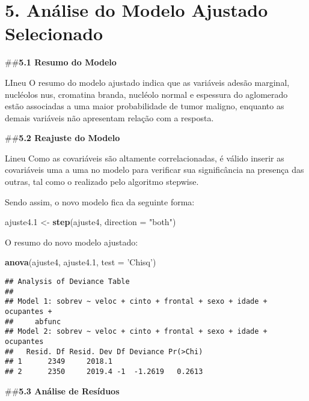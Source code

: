 \documentclass[]{article}
\newenvironment{Shaded}{\begin{snugshade}}{\end{snugshade}}
\newcommand{\KeywordTok}[1]{\textcolor[rgb]{0.13,0.29,0.53}{\textbf{#1}}}
\newcommand{\DataTypeTok}[1]{\textcolor[rgb]{0.13,0.29,0.53}{#1}}
\newcommand{\FloatTok}[1]{\textcolor[rgb]{0.00,0.00,0.81}{#1}}
\newcommand{\StringTok}[1]{\textcolor[rgb]{0.31,0.60,0.02}{#1}}
\newcommand{\NormalTok}[1]{#1}
\begin{document}
\hypertarget{analise-do-modelo-ajustado-selecionado}{%
\section{5. Análise do Modelo Ajustado
Selecionado}\label{analise-do-modelo-ajustado-selecionado}}

\#\#\textbf{5.1 Resumo do Modelo}

LIneu O resumo do modelo ajustado indica que as variáveis adesão
marginal, nucléolos nus, cromatina branda, nucléolo normal e espessura
do aglomerado estão associadas a uma maior probabilidade de tumor
maligno, enquanto as demais variáveis não apresentam relação com a
resposta.

\#\#\textbf{5.2 Reajuste do Modelo}

Lineu Como as covariáveis são altamente correlacionadas, é válido
inserir as covariáveis uma a uma no modelo para verificar sua
significância na presença das outras, tal como o realizado pelo
algoritmo stepwise.

Sendo assim, o novo modelo fica da seguinte forma:

\begin{Shaded}
\begin{Highlighting}[]
\NormalTok{ajuste4}\FloatTok{.1}\NormalTok{ <-}\StringTok{ }\KeywordTok{step}\NormalTok{(ajuste4, }\DataTypeTok{direction =} \StringTok{"both"}\NormalTok{)}
\end{Highlighting}
\end{Shaded}

O resumo do novo modelo ajustado:

\begin{Shaded}
\begin{Highlighting}[]
\KeywordTok{anova}\NormalTok{(ajuste4, ajuste4}\FloatTok{.1}\NormalTok{, }\DataTypeTok{test =} \StringTok{'Chisq'}\NormalTok{)}
\end{Highlighting}
\end{Shaded}

\begin{verbatim}
## Analysis of Deviance Table
## 
## Model 1: sobrev ~ veloc + cinto + frontal + sexo + idade + ocupantes + 
##     abfunc
## Model 2: sobrev ~ veloc + cinto + frontal + sexo + idade + ocupantes
##   Resid. Df Resid. Dev Df Deviance Pr(>Chi)
## 1      2349     2018.1                     
## 2      2350     2019.4 -1  -1.2619   0.2613
\end{verbatim}

\#\#\textbf{5.3 Análise de Resíduos}
\end{document}
